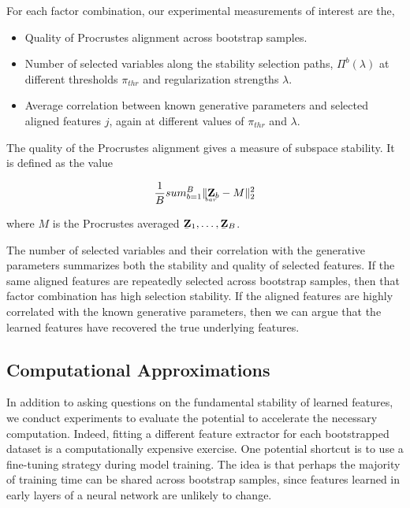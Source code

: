 For each factor combination, our experimental measurements of interest are the,

\begin{itemize}
\item Quality of Procrustes alignment across bootstrap samples.
\item Number of selected variables along the stability selection paths,
  $\Pi^{b}\left(\lambda\right)$ at different thresholds $\pi_{thr}$ and
  regularization strengths $\lambda$.
\item Average correlation between known generative parameters and selected
  aligned features $j$, again at different values of $\pi_{thr}$ and $\lambda$.
\end{itemize}

The quality of the Procrustes alignment gives a measure of subspace stability. It is defined as the value

\begin{align*}
\frac{1}{B} sum_{b = 1}^{B} \|\underaccent{bar}{\mathbf{Z}}_{b}  - M\|_{2}^{2}
\end{align*}

where $M$ is the Procrustes averaged $\underaccent{\bar}{\mathbf{Z}}_{1}, \dots, \underaccent{\bar}{\mathbf{Z}}_{B}$.

The number of selected variables and their correlation with the generative parameters summarizes both the stability and quality of selected features. If the same aligned features are repeatedly selected across bootstrap samples, then that factor combination has high selection stability. If the aligned features are highly correlated with the known generative parameters, then we can argue that the learned features have recovered the true underlying features.

\subsection{Computational Approximations}

In addition to asking questions on the fundamental stability of learned features, we conduct experiments to evaluate the potential to accelerate the necessary computation. Indeed, fitting a different feature extractor for each bootstrapped dataset is a computationally expensive exercise. One potential shortcut is to use a fine-tuning strategy during model training. The idea is that perhaps the majority of training time can be shared across bootstrap samples, since features learned in early layers of a neural network are unlikely to change.


